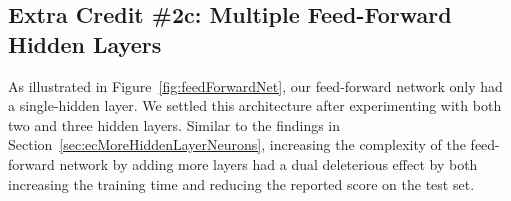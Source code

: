 \documentclass{report}
\begin{document}
  \subsection{Extra Credit \#2c: Multiple Feed-Forward Hidden Layers}
  
  As illustrated in Figure~\ref{fig:feedForwardNet}, our feed-forward network only had a single-hidden layer.  We settled this architecture after experimenting with both two and three hidden layers.  Similar to the findings in Section~\ref{sec:ecMoreHiddenLayerNeurons}, increasing the complexity of the feed-forward network by adding more layers had a dual deleterious effect by both increasing the training time and reducing the reported score on the test set.
     
\end{document}
